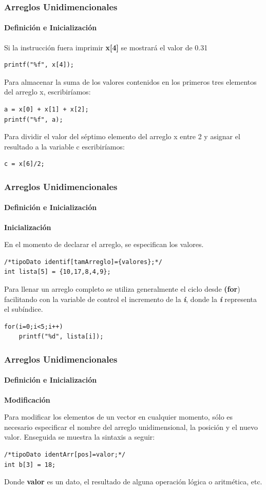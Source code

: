 \begin{frame}[fragile]
    \frametitle{Arreglos Unidimencionales}
    \framesubtitle{Definición e Inicialización}
    Si la instrucción fuera imprimir \textbf{x[4]} se mostrará el valor de 0.31\\
    \begin{lstlisting}
printf("%f", x[4]);
    \end{lstlisting}
    Para almacenar la suma de los valores contenidos en los primeros tres elementos del arreglo x, escribiríamos:\\
    \begin{lstlisting}
a = x[0] + x[1] + x[2];
printf("%f", a);
    \end{lstlisting}
    Para dividir el valor del séptimo elemento del arreglo x entre 2 y asignar el resultado a la variable c escribiríamos:
    \begin{lstlisting}
c = x[6]/2;
    \end{lstlisting}
\end{frame}

\begin{frame}[fragile,t]
    \frametitle{Arreglos Unidimencionales}
    \framesubtitle{Definición e Inicialización}
    \begin{center}
        \textbf{Inicialización}
    \end{center}
    En el momento de declarar el arreglo, se especifican los valores.
    \begin{lstlisting}
/*tipoDato identif[tamArreglo]={valores};*/
int lista[5] = {10,17,8,4,9};
    \end{lstlisting}
    \vspace{-3mm}
    Para llenar un arreglo completo se utiliza generalmente el ciclo desde \textbf{(for}) facilitando con la variable de control el incremento de la \textbf{\textit{i}}, donde la \textbf{\textit{i}} representa el subíndice.
    \begin{lstlisting}
for(i=0;i<5;i++)
    printf("%d", lista[i]);
    \end{lstlisting}
\end{frame}


\begin{frame}[fragile]
    \frametitle{Arreglos Unidimencionales}
    \framesubtitle{Definición e Inicialización}
    \begin{center}
        \textbf{Modificación}
    \end{center}
    \justify
    Para modificar los elementos de un vector en cualquier momento, sólo es necesario especificar el nombre del arreglo unidimensional, la posición y el nuevo valor. Enseguida se muestra la sintaxis a seguir:
    \begin{lstlisting}
/*tipoDato identArr[pos]=valor;*/
int b[3] = 18;
    \end{lstlisting}
    Donde \textbf{valor} es un dato, el resultado de alguna operación lógica o aritmética, etc.
\end{frame}